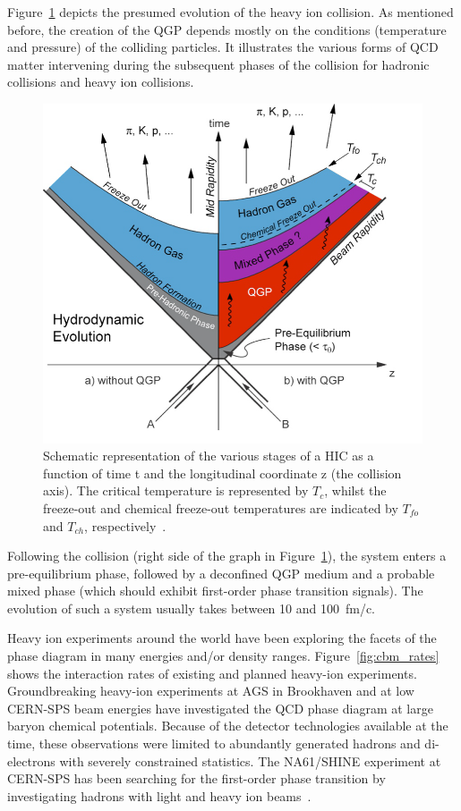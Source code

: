 Figure~\ref{fig_heavyion} depicts the presumed evolution of the heavy ion collision. As mentioned before, the creation of the \gls{QGP} depends mostly on the conditions (temperature and pressure) of the colliding particles. It illustrates the various forms of QCD matter intervening during the subsequent phases of the collision for hadronic collisions and heavy ion collisions.
\begin{figure}[!h]
\centering
 \includegraphics[width=0.6\columnwidth]{Chapter1/images/heavyion.png}
\caption{Schematic representation of the various stages of a HIC as a function of time t and the longitudinal coordinate z (the collision axis). The critical temperature is represented by $T_c$, whilst the freeze-out and chemical freeze-out temperatures are indicated by $T_{fo}$ and $T_{ch}$, respectively~\cite{Sahoo:2745520}.}
\label{fig_heavyion}
\end{figure}

 Following the collision (right side of the graph in Figure~\ref{fig_heavyion}), the system enters a pre-equilibrium phase, followed by a deconfined QGP medium and a probable mixed phase (which should exhibit first-order phase transition signals). The evolution of such a system usually takes between 10 and 100~fm/c. 

Heavy ion experiments around the world have been exploring the facets of the phase diagram in many energies and/or density ranges. Figure~\ref{fig:cbm_rates} shows the interaction rates of existing and planned heavy-ion experiments. Groundbreaking heavy-ion experiments at AGS in Brookhaven and at low CERN-SPS beam energies have investigated the QCD phase diagram at large baryon chemical potentials. Because of the detector technologies available at the time, these observations were limited to abundantly generated hadrons and di-electrons with severely constrained statistics. The NA61/SHINE experiment at CERN-SPS has been searching for the first-order phase transition by investigating hadrons with light and heavy ion beams~\cite{CBM_physics, Turko:2301677}.

